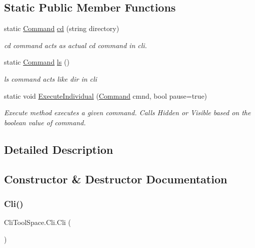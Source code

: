 \subsection*{Static Public Member Functions}
\begin{DoxyCompactItemize}
\item 
static \mbox{\hyperlink{class_cli_tool_space_1_1_command}{Command}} \mbox{\hyperlink{class_cli_tool_space_1_1_cli_a8d79672635592ff610653189fd7e6d15}{cd}} (string directory)
\begin{DoxyCompactList}\small\item\em cd command acts as actual cd command in cli. \end{DoxyCompactList}\item 
static \mbox{\hyperlink{class_cli_tool_space_1_1_command}{Command}} \mbox{\hyperlink{class_cli_tool_space_1_1_cli_abea5ac9db69f60d7cec5103565873ae1}{ls}} ()
\begin{DoxyCompactList}\small\item\em ls command acts like dir in cli \end{DoxyCompactList}\item 
static void \mbox{\hyperlink{class_cli_tool_space_1_1_cli_a0e3c1975671466f8f2c8924c95f0b883}{Execute\+Individual}} (\mbox{\hyperlink{class_cli_tool_space_1_1_command}{Command}} cmnd, bool pause=true)
\begin{DoxyCompactList}\small\item\em Execute method executes a given command. Calls Hidden or Visible based on the boolean value of command. \end{DoxyCompactList}\end{DoxyCompactItemize}


\subsection{Detailed Description}




\subsection{Constructor \& Destructor Documentation}
\mbox{\label{class_cli_tool_space_1_1_cli_a063243e835cc8e87c67e2d1da0310572}} 
\subsubsection{\texorpdfstring{Cli()}{Cli()}}
{\footnotesize\ttfamily Cli\+Tool\+Space.\+Cli.\+Cli (\begin{DoxyParamCaption}{ }\end{DoxyParamCaption})}



